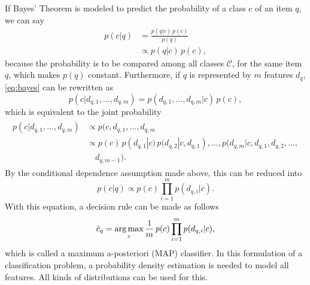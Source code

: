 If Bayes' Theorem is modeled to predict the probability of a class $c$ of an item $q$, we can say
\begin{align}
    \label{eq:bayes}
    p(c|q)      &= \frac{p(q|c)\,p(c)}{p(q)}\\
                &\propto p(q|c)\,p(c),
\end{align}
because the probability is to be compared among all classes $\mathcal{C}$, for the same item $q$, which makes $p(q)$ constant. Furthermore, if $q$ is represented by $m$ features $d_q$, \eqref{eq:bayes} can be rewritten as
\begin{equation}
    p(c|d_{q,1},\dotsc,d_{q,m}) = p(d_{q,1}, \dotsc,d_{q,m}|c)\,p(c),
\end{equation}
which is equivalent to the joint probability
\begin{align}\begin{split}
    p(c|d_{q,1},\dotsc,d_{q,m}) &\propto p(c,d_{q,1}, \dotsc,d_{q,m}\\
        &\propto p(c)\,p(d_{q,1}|c)\, p(d_{q,2}|c,d_{q,1}), \dotsc,p(d_{q,m}|c,d_{q,1},d_{q,2},\dotsc,\\&\quad d_{q,m-1}).
    \end{split} 
\end{align}
By the conditional dependence assumption made above, this can be reduced into
\begin{equation}
    p(c|q) \propto p(c)\prod_{i=1}^m p(d_{q,i}|c).
\end{equation}
With this equation, a decision rule can be made as follows
\begin{equation} \label{eq:map}
    \hat c_q = \operatorname*{arg\,max}_c \frac{1}{m}\,p(c)\prod_{i=1}^m p(d_{q,i}|c),
\end{equation}
which is called a maximum a-posteriori (MAP) classifier. In this formulation of a classification problem, a probability density estimation is needed to model all features. All kinds of distributions can be used for this.

